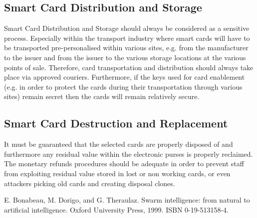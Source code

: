 \documentclass[12pt]{article}
\begin{document}
\subsection{Smart Card Distribution and Storage}
Smart Card Distribution and Storage should
always be considered as a sensitive process. Especially
within the transport industry where smart cards will
have to be transported pre-personalised within various
sites, e.g. from the manufacturer to the issuer and from
the issuer to the various storage locations at the various
points of sale. Therefore, card transportation and
distribution should always take place via approved
couriers.
Furthermore, if the keys used for card enablement (e.g.
in order to protect the cards during their transportation
through various sites) remain secret then the cards will
remain relatively secure.

\subsection{Smart Card Destruction and Replacement}
It must be guaranteed that the
selected cards are properly disposed of and furthermore
any residual value within the electronic purses is
properly reclaimed. The monetary refunds procedures
should be adequate in order to prevent staff from
exploiting residual value stored in lost or non working
cards, or even attackers picking old cards and creating
disposal clones.



\newpage
\begin{thebibliography}{9}
E. Bonabeau, M. Dorigo, and G. Theraulaz. Swarm intelligence:
from natural to artificial intelligence. Oxford University
Press, 1999. ISBN 0-19-513158-4.
 
\end{thebibliography}
\end{document}
